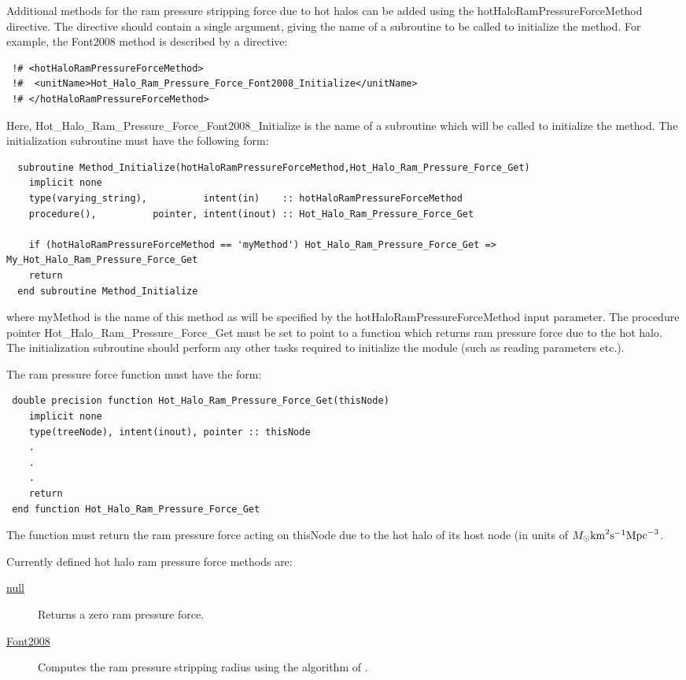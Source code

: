 Additional methods for the ram pressure stripping force due to hot halos can be added using the {\normalfont \ttfamily hotHaloRamPressureForceMethod} directive. The directive should contain a single argument, giving the name of a subroutine to be called to initialize the method. For example, the {\normalfont \ttfamily Font2008} method is described by a directive:
\begin{verbatim}
 !# <hotHaloRamPressureForceMethod>
 !#  <unitName>Hot_Halo_Ram_Pressure_Force_Font2008_Initialize</unitName>
 !# </hotHaloRamPressureForceMethod>
\end{verbatim}
Here, {\normalfont \ttfamily Hot\_Halo\_Ram\_Pressure\_Force\_Font2008\_Initialize} is the name of a subroutine which will be called to initialize the method. The initialization subroutine must have the following form:
\begin{verbatim}
  subroutine Method_Initialize(hotHaloRamPressureForceMethod,Hot_Halo_Ram_Pressure_Force_Get)
    implicit none
    type(varying_string),          intent(in)    :: hotHaloRamPressureForceMethod
    procedure(),          pointer, intent(inout) :: Hot_Halo_Ram_Pressure_Force_Get
    
    if (hotHaloRamPressureForceMethod == 'myMethod') Hot_Halo_Ram_Pressure_Force_Get => My_Hot_Halo_Ram_Pressure_Force_Get
    return
  end subroutine Method_Initialize
\end{verbatim}
where {\normalfont \ttfamily myMethod} is the name of this method as will be specified by the {\normalfont \ttfamily hotHaloRamPressureForceMethod} input parameter. The procedure pointer {\normalfont \ttfamily Hot\_Halo\_Ram\_Pressure\_Force\_Get} must be set to point to a function which returns ram pressure force due to the hot halo. The initialization subroutine should perform any other tasks required to initialize the module (such as reading parameters etc.).

The ram pressure force function must have the form:
\begin{verbatim}
 double precision function Hot_Halo_Ram_Pressure_Force_Get(thisNode)
    implicit none
    type(treeNode), intent(inout), pointer :: thisNode
    .
    .
    .
    return
 end function Hot_Halo_Ram_Pressure_Force_Get
\end{verbatim}
The function must return the ram pressure force acting on {\normalfont \ttfamily thisNode} due to the hot halo of its host node (in units of $M_\odot \hbox{km}^2 \hbox{s}^{-1} \hbox{Mpc}^{-3}$.

Currently defined hot halo ram pressure force methods are:
\begin{description}
 \item [\hyperlink{hot_halo.ram_pressure_force.null.F90:hot_halo_ram_pressure_force_null:hot_halo_ram_pressure_force_null_get}{{\normalfont \ttfamily null}}] Returns a zero ram pressure force.
 \item [\hyperlink{hot_halo.ram_pressure_force.Font2008.F90:hot_halo_ram_pressure_force_font2008:hot_halo_ram_pressure_force_font2008_get}{{\normalfont \ttfamily Font2008}}] Computes the ram pressure stripping radius using the algorithm of \cite{font_colours_2008}.
\end{description}

